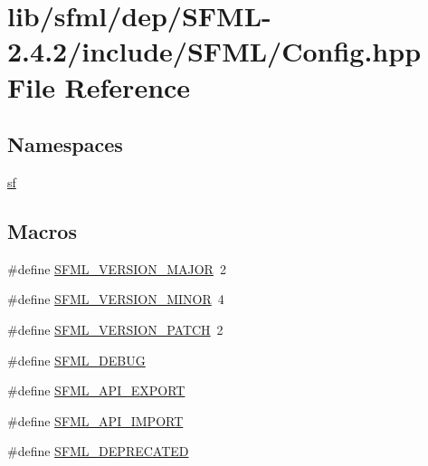 \hypertarget{sfml_2dep_2_s_f_m_l-2_84_82_2include_2_s_f_m_l_2_config_8hpp}{\section{lib/sfml/dep/\-S\-F\-M\-L-\/2.4.2/include/\-S\-F\-M\-L/\-Config.hpp File Reference}
\label{sfml_2dep_2_s_f_m_l-2_84_82_2include_2_s_f_m_l_2_config_8hpp}
}
\subsection*{Namespaces}
\begin{DoxyCompactItemize}
\item 
\hyperlink{namespacesf}{sf}
\end{DoxyCompactItemize}
\subsection*{Macros}
\begin{DoxyCompactItemize}
\item 
\#define \hyperlink{sfml_2dep_2_s_f_m_l-2_84_82_2include_2_s_f_m_l_2_config_8hpp_ab601e78ee9806b7ef75b242681af3bf2}{S\-F\-M\-L\-\_\-\-V\-E\-R\-S\-I\-O\-N\-\_\-\-M\-A\-J\-O\-R}~2
\item 
\#define \hyperlink{sfml_2dep_2_s_f_m_l-2_84_82_2include_2_s_f_m_l_2_config_8hpp_a91a4f1f9aeae335e13bb4cfa8f018865}{S\-F\-M\-L\-\_\-\-V\-E\-R\-S\-I\-O\-N\-\_\-\-M\-I\-N\-O\-R}~4
\item 
\#define \hyperlink{sfml_2dep_2_s_f_m_l-2_84_82_2include_2_s_f_m_l_2_config_8hpp_acccd4412c83e570fbc4d1d5638b035b3}{S\-F\-M\-L\-\_\-\-V\-E\-R\-S\-I\-O\-N\-\_\-\-P\-A\-T\-C\-H}~2
\item 
\#define \hyperlink{sfml_2dep_2_s_f_m_l-2_84_82_2include_2_s_f_m_l_2_config_8hpp_a90cd534d01b83efcf7e6769551c2a3db}{S\-F\-M\-L\-\_\-\-D\-E\-B\-U\-G}
\item 
\#define \hyperlink{sfml_2dep_2_s_f_m_l-2_84_82_2include_2_s_f_m_l_2_config_8hpp_ab2d9ba01221055369f9707a4d7b528c2}{S\-F\-M\-L\-\_\-\-A\-P\-I\-\_\-\-E\-X\-P\-O\-R\-T}
\item 
\#define \hyperlink{sfml_2dep_2_s_f_m_l-2_84_82_2include_2_s_f_m_l_2_config_8hpp_aba0bbe5791bee6633caa835c7f6a12a4}{S\-F\-M\-L\-\_\-\-A\-P\-I\-\_\-\-I\-M\-P\-O\-R\-T}
\item 
\#define \hyperlink{sfml_2dep_2_s_f_m_l-2_84_82_2include_2_s_f_m_l_2_config_8hpp_a9d22ae32bba2961ae9abc7e40f035fc7}{S\-F\-M\-L\-\_\-\-D\-E\-P\-R\-E\-C\-A\-T\-E\-D}
\end{DoxyCompactItemize}


